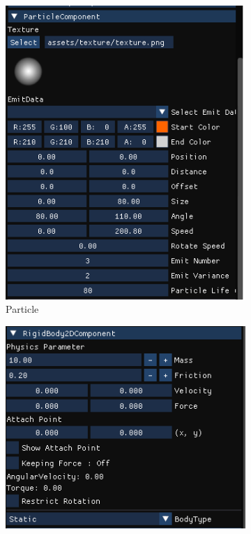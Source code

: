 \begin{figure}[h]
\begin{subfigure}[b]{0.24\linewidth}
\begin{center}
        \includegraphics[width=\linewidth]{./resources/editor/ins_particle.png}
        \caption{Particle}
        \end{center}
    \end{subfigure}
    \begin{subfigure}[b]{0.24\linewidth}
        \begin{center}
        \includegraphics[width=\linewidth]{./resources/editor/ins_rigidbody2D.png}

\end{center}
\end{subfigure}
\end{figure}
